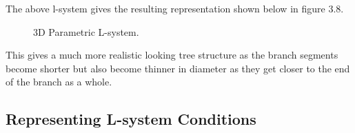 \begin{flushleft}
The above l-system gives the resulting representation shown below in figure 3.8. 

\begin{figure}[htbp]
	{\centering
		\vspace{7px}
		\setlength{\fboxrule}{1pt}
		\caption{3D Parametric L-system.}
	}
\end{figure}

\FloatBarrier

This gives a much more realistic looking tree structure as the branch segments become shorter but also become thinner in diameter as they get closer to the end of the branch as a whole. 

\end{flushleft}



\subsection{Representing L-system Conditions} \label{Condition L-system Subsection}

